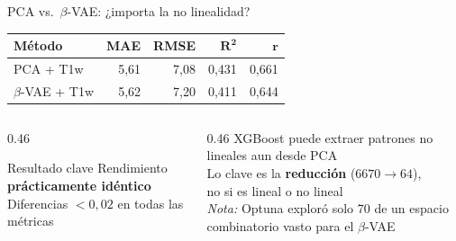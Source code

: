 \documentclass[aspectratio=169, 11pt]{beamer}
\newcommand{\highlight}[1]{\textcolor{uncaccent}{\textbf{#1}}}
\begin{document}
\begin{frame}{PCA vs.\ $\beta$-VAE: ¿importa la no linealidad?}
  \centering
  {\small
  \begin{tabular}{lrrrr}
    \toprule
    \textbf{Método} & \textbf{MAE} & \textbf{RMSE} & $\boldsymbol{R^2}$ & $\boldsymbol{r}$ \\
    \midrule
    PCA + T1w & 5,61 & 7,08 & 0,431 & 0,661 \\
    $\beta$-VAE + T1w & 5,62 & 7,20 & 0,411 & 0,644 \\
    \bottomrule
  \end{tabular}}

  \vspace{0.5cm}
  \begin{columns}[T]
    \begin{column}{0.46\textwidth}
      \begin{block}{Resultado clave}
        \centering
        Rendimiento \highlight{prácticamente idéntico}\\[4pt]
        {\small Diferencias $< 0{,}02$ en todas las métricas}
      \end{block}
    \end{column}
    \begin{column}{0.46\textwidth}
      \vspace{0.2cm}
      XGBoost puede extraer patrones no lineales aun desde PCA\\[6pt]
      Lo clave es la \highlight{reducción} ($6670 \rightarrow 64$),\\no si es lineal o no lineal\\[6pt]
      {\scriptsize \textit{Nota:} Optuna exploró solo 70 de un espacio combinatorio vasto para el $\beta$-VAE}
    \end{column}
  \end{columns}
\end{frame}
\end{document}
